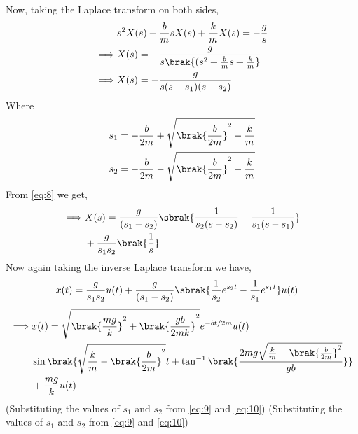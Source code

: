 \documentclass[journal,12pt,twocolumn]{IEEEtran}
\theoremstyle{remark}
\begin{document}
\begin{enumerate}
    Now, taking the Laplace transform on both sides,
    \begin{align}
        &s^2X(s)+\frac{b}{m}sX(s)+\frac{k}{m}X(s)=-\frac{g}{s} \label{eq:6}\\
        \implies &X(s)=-\frac{g}{s\brak{(s^2+\frac{b}{m}s+\frac{k}{m}}} \label{eq:7}\\
        \implies &X(s)=-\frac{g}{s(s-s_1)(s-s_2)} \label{eq:8}
    \end{align}
    Where
    \begin{align}
        &s_1=-\frac{b}{2m}+\sqrt{\brak{\frac{b}{2m}}^2-\frac{k}{m}} \label{eq:9}\\
        &s_2=-\frac{b}{2m}-\sqrt{\brak{\frac{b}{2m}}^2-\frac{k}{m}} \label{eq:10}
    \end{align}
    From \eqref{eq:8} we get,
    \begin{align}
        \begin{split}
            \implies &X(s)=\frac{g}{(s_1-s_2)}\sbrak{\frac{1}{s_2(s-s_2)}-\frac{1}{s_1(s-s_1)}} \\
            &+\frac{g}{s_1s_2}\brak{\frac{1}{s}} \label{eq:11}
        \end{split}
    \end{align}
    Now again taking the inverse Laplace transform we have,
    \begin{align}
        &x(t)=\frac{g}{s_1s_2}u(t)+\frac{g}{(s_1-s_2)}\sbrak{\frac{1}{s_2}e^{s_2t}-\frac{1}{s_1}e^{s_1t}}u(t)\label{eq:12}
    \end{align}
    \begin{align}
    \begin{split}
    \implies &x(t) =\sqrt{\brak{\frac{mg}{k}}^2 + \brak{\frac{gb}{2mk}}^2}e^{-bt/2m}u(t) \\
            &\sin{\brak{\sqrt{\frac{k}{m} - \brak{\frac{b}{2m}}^2}t + \tan^{-1}\brak{\frac{2mg\sqrt{\frac{k}{m} - \brak{\frac{b}{2m}}^2}}{gb}}}} \\
            &+ \frac{mg}{k}
        u(t) \label{eq:13}
\end{split}
\end{align}
    (Substituting the values of $s_1$ and $s_2$ from \eqref{eq:9} and \eqref{eq:10})
    (Substituting the values of $s_1$ and $s_2$ from \eqref{eq:9} and \eqref{eq:10})


\end{enumerate}
\end{document}
